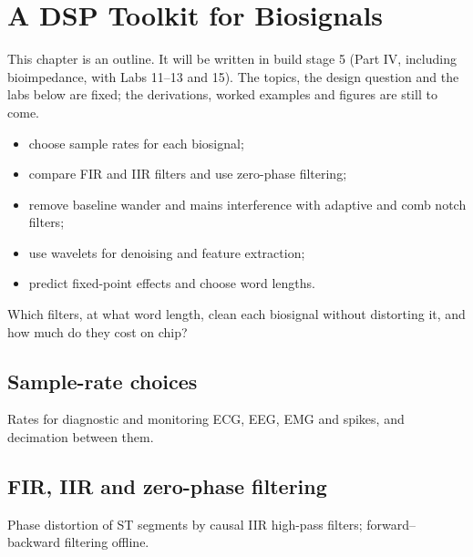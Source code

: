 \chapter{A DSP Toolkit for Biosignals}\label{ch:dsp}

\begin{specnote}
This chapter is an outline. It will be written in build stage 5 (Part IV, including bioimpedance, with Labs 11--13 and 15). The topics, the design question and the labs below are fixed; the derivations, worked examples and figures are still to come.
\end{specnote}

\begin{objectives}
\begin{itemize}
  \item choose sample rates for each biosignal;
  \item compare FIR and IIR filters and use zero-phase filtering;
  \item remove baseline wander and mains interference with adaptive and comb notch filters;
  \item use wavelets for denoising and feature extraction;
  \item predict fixed-point effects and choose word lengths.
\end{itemize}
\end{objectives}

\begin{insight}
Which filters, at what word length, clean each biosignal without distorting it, and how much do they cost on chip?
\end{insight}

\section{Sample-rate choices}\label{sec:ch23-1}
Rates for diagnostic and monitoring ECG, EEG, EMG and spikes, and decimation between them.

\section{FIR, IIR and zero-phase filtering}\label{sec:ch23-2}
Phase distortion of ST segments by causal IIR high-pass filters; forward--backward filtering offline.

